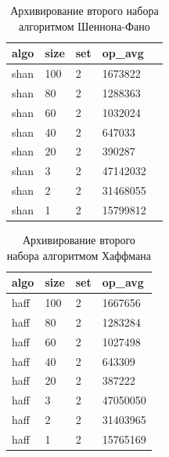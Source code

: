 \documentclass[a4paper,12pt]{article} %
\begin{document}
    \begin{table}[!htb]
        \centering
        \caption{Архивирование второго набора алгоритмом Шеннона-Фано}
        \begin{tabular}{|l|l|l|l|l|}
            \hline
            algo & size & set & op\_avg \\ \hline
            shan & 100 & 2 & 1673822 \\ \hline
            shan & 80 & 2 & 1288363  \\ \hline
            shan & 60 & 2 & 1032024  \\ \hline
            shan & 40 & 2 & 647033  \\ \hline
            shan & 20 & 2 & 390287  \\ \hline
            shan & 3 & 2 & 47142032  \\ \hline
            shan & 2 & 2 & 31468055 \\ \hline
            shan & 1 & 2 & 15799812  \\ \hline
        \end{tabular}
    \end{table}
    \begin{table}[!htb]
        \centering
        \caption{Архивирование второго набора алгоритмом Хаффмана}
        \begin{tabular}{|l|l|l|l|}
            \hline
            algo & size & set & op\_avg \\ \hline
            haff & 100 & 2 & 1667656 \\ \hline
            haff & 80 & 2 & 1283284 \\ \hline
            haff & 60 & 2 & 1027498 \\ \hline
            haff & 40 & 2 & 643309 \\ \hline
            haff & 20 & 2 & 387222 \\ \hline
            haff & 3 & 2 & 47050050 \\ \hline
            haff & 2 & 2 & 31403965 \\ \hline
            haff & 1 & 2 & 15765169 \\ \hline
        \end{tabular}
    \end{table}
\end{document}
